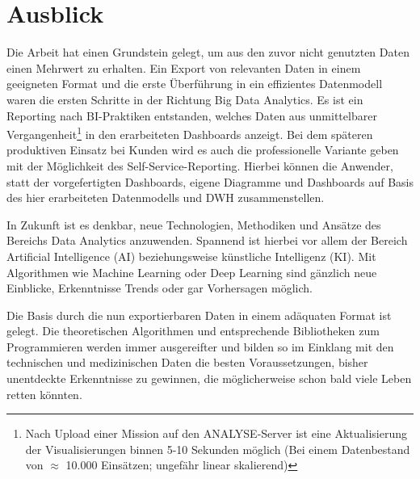 \section{Ausblick}
Die Arbeit hat einen Grundstein gelegt, um aus den zuvor nicht genutzten Daten einen Mehrwert zu erhalten.
Ein Export von relevanten Daten in einem geeigneten Format und die erste Überführung in ein effizientes Datenmodell waren die ersten Schritte in der Richtung \glqq Big Data Analytics\grqq {}.
Es ist ein Reporting nach \gls{BI}-Praktiken entstanden, welches Daten aus unmittelbarer Vergangenheit\footnote{Nach Upload einer Mission auf den \gls{ANALYSE}-Server ist eine Aktualisierung der Visualisierungen binnen 5-10 Sekunden möglich (Bei einem Datenbestand von $\approx$ 10.000 Einsätzen; ungefähr linear skalierend)} in den erarbeiteten Dashboards anzeigt.
Bei dem späteren produktiven Einsatz bei Kunden wird es auch die professionelle Variante geben mit der Möglichkeit des Self-Service-Reporting.
Hierbei können die Anwender, statt der vorgefertigten Dashboards, eigene Diagramme und Dashboards auf Basis des hier erarbeiteten Datenmodells und \gls{DWH} zusammenstellen.

In Zukunft ist es denkbar, neue Technologien, Methodiken und Ansätze des Bereichs \glqq Data Analytics\grqq{} anzuwenden.
Spannend ist hierbei vor allem der Bereich \glqq Artificial Intelligence\grqq{} (AI) beziehungsweise künstliche Intelligenz (KI).
Mit Algorithmen wie \glqq Machine Learning\grqq{} oder \glqq Deep Learning\grqq{} sind gänzlich neue Einblicke, Erkenntnisse Trends oder gar Vorhersagen möglich.

Die Basis durch die nun exportierbaren Daten in einem adäquaten Format ist gelegt.
Die theoretischen Algorithmen und entsprechende Bibliotheken zum Programmieren werden immer ausgereifter und bilden so im Einklang mit den technischen und medizinischen Daten die besten Voraussetzungen, bisher unentdeckte Erkenntnisse zu gewinnen, die möglicherweise schon bald viele Leben retten könnten.


